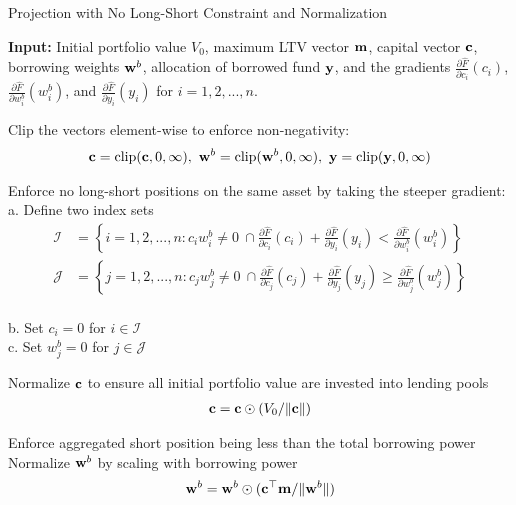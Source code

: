 \documentclass{article} %
\newcommand{\INDSTATE}[1][1]{\hspace{#1\algorithmicindent}}
\theoremstyle{plain}
\theoremstyle{definition} %
\begin{document}
  \begin{algorithm}[th]
    \caption{Projection with No Long-Short Constraint and Normalization}\label{alg:projection}
    \begin{algorithmic}[1]
    \STATE \textbf{Input:} 
    Initial portfolio value $V_0$, maximum LTV vector ${\bf m}$,
    capital vector ${\bf c}$, borrowing weights ${\bf w}^b$, allocation of borrowed fund $\bf{y}$,
    and the gradients 
    $\frac{\partial \hat F}{\partial c_i}(c_i)$, $\frac{\partial \hat F}{\partial w^b_i}(w^b_i)$, and 
    $\frac{\partial \hat F}{\partial y_i}(y_i)$ for $i=1,2,...,n$.

    \STATE Clip the vectors element-wise to enforce non-negativity:
    \begin{align*}
    {\bf c} = \text{clip}({\bf c} , 0, \infty),\ {\bf w}^b = \text{clip}({\bf w}^b, 0, \infty),\ {\bf y} = \text{clip}( {\bf y}, 0, \infty)
    \end{align*}
    
    \STATE Enforce no long-short positions on the same asset by taking the steeper gradient:\\
    \INDSTATE a. Define two index sets
    \begin{align*} 
    \mathcal{I} &= \left\{
      i=1,2,...,n: c_i w^b_i\neq 0\ \cap 
    \frac{\partial \hat F}{\partial c_i}(c_i) + \frac{\partial \hat F}{\partial y_i}(y_i) < \frac{\partial \hat F}{\partial w^b_i}(w^b_i)
    \right\}\\
    \mathcal{J} &= \left\{j=1,2,...,n: c_jw^b_j\neq 0\ \cap 
    \frac{\partial \hat F}{\partial c_j}(c_j) + \frac{\partial \hat F}{\partial y_j}(y_j) \geq \frac{\partial \hat F}{\partial w^b_j}(w^b_j)\right\}
  \end{align*}\\
    \INDSTATE b. Set $c_i=0$ for $i \in \mathcal{I}$\\
    \INDSTATE c. Set $w^b_j=0$ for $j \in \mathcal{J}$
    
    \STATE Normalize ${\bf c}$ to ensure all initial portfolio value are invested into lending pools
    \begin{align*}{\bf c} = {\bf c} \odot (V_0/ \|{\bf c}\|) \end{align*}
    
    \STATE Enforce aggregated short position being less than the total borrowing power
        \STATE Normalize ${\bf w}^b$ by scaling with borrowing power
        \begin{align*}{\bf w}^b = {\bf w}^b \odot ({\bf c}^\top {\bf m}/ \|{\bf w}^b\|) \end{align*}
    \ENDIF
    

\end{algorithmic}
\end{algorithm}
\end{document}
